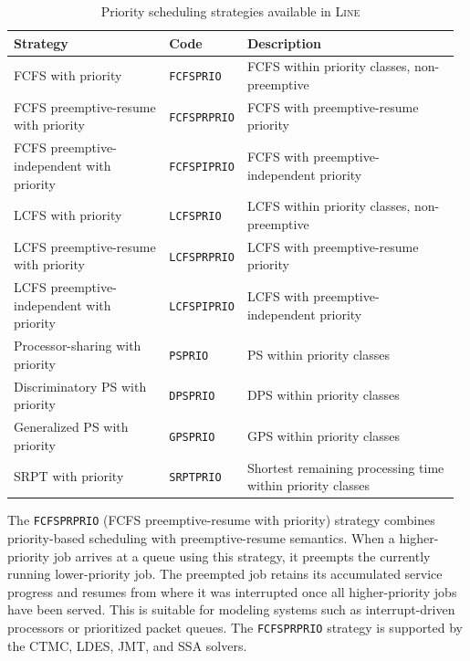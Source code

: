 \begin{table}[ht!]
\renewcommand{\arraystretch}{1.2}
\centering
\caption{Priority scheduling strategies available in \textsc{Line}}
{\small
\begin{tabular}{|p{0.35\linewidth}|p{0.14\linewidth}|p{0.48\linewidth}|}
\hline
\textbf{Strategy} & \textbf{Code} & \textbf{Description} \\
\hline
FCFS with priority & \texttt{FCFSPRIO} & FCFS within priority classes, non-preemptive \\
\hline
FCFS preemptive-resume with priority & \texttt{FCFSPRPRIO} & FCFS with preemptive-resume priority \\
\hline
FCFS preemptive-independent with priority & \texttt{FCFSPIPRIO} & FCFS with preemptive-independent priority \\
\hline
LCFS with priority & \texttt{LCFSPRIO} & LCFS within priority classes, non-preemptive \\
\hline
LCFS preemptive-resume with priority & \texttt{LCFSPRPRIO} & LCFS with preemptive-resume priority \\
\hline
LCFS preemptive-independent with priority & \texttt{LCFSPIPRIO} & LCFS with preemptive-independent priority \\
\hline
Processor-sharing with priority & \texttt{PSPRIO} & PS within priority classes \\
\hline
Discriminatory PS with priority & \texttt{DPSPRIO} & DPS within priority classes \\
\hline
Generalized PS with priority & \texttt{GPSPRIO} & GPS within priority classes \\
\hline
SRPT with priority & \texttt{SRPTPRIO} & Shortest remaining processing time within priority classes \\
\hline
\end{tabular}
}
\label{tab:priority_sched}
\end{table}

The \texttt{FCFSPRPRIO} (FCFS preemptive-resume with priority) strategy combines priority-based scheduling with preemptive-resume semantics. When a higher-priority job arrives at a queue using this strategy, it preempts the currently running lower-priority job. The preempted job retains its accumulated service progress and resumes from where it was interrupted once all higher-priority jobs have been served. This is suitable for modeling systems such as interrupt-driven processors or prioritized packet queues. The \texttt{FCFSPRPRIO} strategy is supported by the CTMC, LDES, JMT, and SSA solvers.

